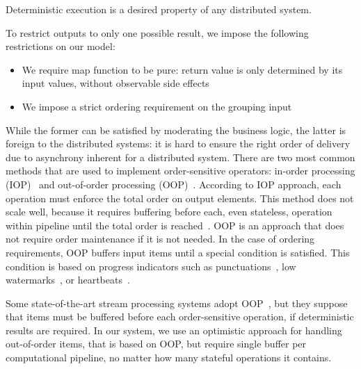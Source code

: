 \label {fs-collision}

Deterministic execution is a desired property of any distributed system. 

To restrict outputs to only one possible result, we impose the following  restrictions on our model: 

\begin{itemize}
  \item We require map function to be pure: return value is only determined by its input values, without observable side effects
  \item We impose a strict ordering requirement on the grouping  input
\end{itemize}

While the former can be satisfied by moderating the  business logic, the latter is foreign to the distributed systems: 
it is hard to ensure the right order of delivery due to asynchrony inherent for a distributed system. There are two most common methods that are used to implement order-sensitive operators: in-order processing (IOP)~\cite{Arasu:2006:CCQ:1146461.1146463, Cranor:2003:GSD:872757.872838} and out-of-order processing (OOP)~\cite{Li:2008:OPN:1453856.1453890}. According to IOP approach, each operation must enforce the total order on output elements. This method does not scale well, because it requires buffering before each, even stateless, operation within pipeline until the total order is reached~\cite{Li:2008:OPN:1453856.1453890}. OOP is an approach that does not require order maintenance if it is not needed. In the case of ordering requirements, OOP buffers input items until a special condition is satisfied. This condition is based on progress indicators such as punctuations~\cite{Tucker:2003:EPS:776752.776780}, low watermarks~\cite{Akidau:2013:MFS:2536222.2536229}, or heartbeats~\cite{Srivastava:2004:FTM:1055558.1055596}.  

Some state-of-the-art stream processing systems adopt OOP~\cite{Carbone:2017:SMA:3137765.3137777}, but they suppose that items must be buffered before each order-sensitive operation, if deterministic results are required. In our system, we use an optimistic approach for handling out-of-order items, that is based on OOP, but require single buffer per computational pipeline, no matter how many stateful operations it contains.
%
%

